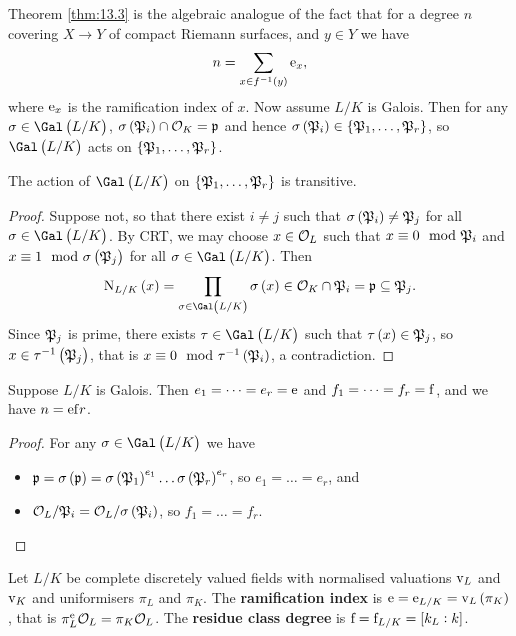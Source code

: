 Theorem \ref{thm:13.3} is the algebraic analogue of the fact that for a degree $ n $ covering $ X \to Y $ of compact Riemann surfaces, and $ y \in Y $ we have
$$ n = \sum_{x \in f^{-1}\br{y}} \e_x, $$
where $ \mathrm{e}_x $ is the ramification index of $ x $. Now assume $ L / K $ is Galois. Then for any $ \sigma \in \Gal\br{L / K} $, $ \sigma\br{\pp_i} \cap \OOO_K = \ppp $ and hence $ \sigma\br{\pp_i} \in \cbr{\pp_1, \dots, \pp_r} $, so $ \Gal\br{L / K} $ acts on $ \cbr{\pp_1, \dots, \pp_r} $.

\begin{proposition}
\label{prop:13.4}
The action of $ \Gal\br{L / K} $ on $ \cbr{\pp_1, \dots, \pp_r} $ is transitive.
\end{proposition}

\begin{proof}
Suppose not, so that there exist $ i \ne j $ such that $ \sigma\br{\pp_i} \ne \pp_j $ for all $ \sigma \in \Gal\br{L / K} $. By CRT, we may choose $ x \in \mathcal{O}_L $ such that $ x \equiv 0 \mod {\mathfrak{P}}_i $ and $ x \equiv 1 \mod \sigma\br{\pp_j} $ for all $ \sigma \in \Gal\br{L / K} $. Then
$$ \N_{L / K}\br{x} = \prod_{\sigma \in \Gal\br{L / K}} \sigma\br{x} \in \OOO_K \cap \pp_i = \ppp \subseteq \pp_j. $$
Since $ \mathfrak{P}_j $ is prime, there exists $ \tau \in \Gal\br{L / K} $ such that $ \tau\br{x} \in \pp_j $, so $ x \in \tau^{-1}\br{\pp_j} $, that is $ x \equiv 0 \mod \tau^{-1}\br{\pp_i} $, a contradiction.
\end{proof}

\pagebreak

\begin{corollary}
Suppose $ L / K $ is Galois. Then $ e_1 = \dots = e_r = \mathrm{e} $ and $ f_1 = \dots = f_r = \mathrm{f} $, and we have $ n = \mathrm{e}\mathrm{f} r $.
\end{corollary}

\begin{proof}
For any $ \sigma \in \Gal\br{L / K} $ we have
\begin{itemize}
\item $ \ppp = \sigma\br{\ppp} = \sigma\br{\pp_1}^{e_1} \dots \sigma\br{\pp_r}^{e_r} $, so $ e_1 = \dots = e_r $, and
\item $ \OOO_L / \pp_i = \OOO_L / \sigma\br{\pp_i} $, so $ f_1 = \dots = f_r $.
\end{itemize}
\end{proof}

Let $ L / K $ be complete discretely valued fields with normalised valuations $ \mathrm{v}_L $ and $ \mathrm{v}_K $ and uniformisers $ \pi_L $ and $ \pi_K $. The \textbf{ramification index} is $ \e = \e_{L / K} = \v_L\br{\pi_K} $, that is $ \pi_L^{\mathrm{e}}\mathcal{O}_L = \pi_K\mathcal{O}_L $. The \textbf{residue class degree} is $ \f = \f_{L / K} = \sbr{k_L : k} $.

